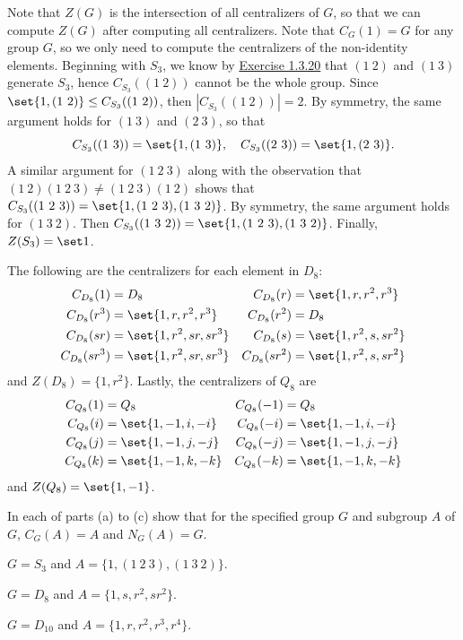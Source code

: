 \begin{sol}
    Note that $Z(G)$ is the intersection of all centralizers of $G$, so that we can compute $Z(G)$ after computing all centralizers. Note that $C_G(1) = G$ for any group $G$, so we only need to compute the centralizers of the non-identity elements. Beginning with $S_3$, we know by \hyperref[ex1.3.20]{Exercise 1.3.20} that $(1\ 2)$ and $(1\ 3)$ generate $S_3$, hence $C_{S_3}((1\ 2))$ cannot be the whole group. Since $\set{1, (1\ 2)} \leq C_{S_3}((1\ 2))$, then $|C_{S_3}((1\ 2))| = 2$. By symmetry, the same argument holds for $(1\ 3)$ and $(2\ 3)$, so that
    \[C_{S_3}((1\ 3)) = \set{1, (1\ 3)}, \quad C_{S_3}((2\ 3)) = \set{1, (2\ 3)}.\]
    A similar argument for $(1\ 2\ 3)$ along with the observation that $(1\ 2)(1\ 2\ 3) \neq (1\ 2\ 3)(1\ 2)$ shows that $C_{S_3}((1\ 2\ 3)) = \set{1, (1\ 2\ 3), (1\ 3\ 2)}$. By symmetry, the same argument holds for $(1\ 3\ 2)$. Then $C_{S_3}((1\ 3\ 2)) = \set{1, (1\ 2\ 3), (1\ 3\ 2)}$. Finally, $Z(S_3) = \set 1$.
    
    The following are the centralizers for each element in $D_8$:
    \begin{align*}
        C_{D_8}(1) & = D_8 & C_{D_8}(r) & = \set{1, r, r^2, r^3} \\
        C_{D_8}(r^3) & = \set{1, r, r^2, r^3} & C_{D_8}(r^2) & = D_8 \\
        C_{D_8}(sr) & = \set{1, r^2, sr, sr^3} & C_{D_8}(s) & = \set{1, r^2, s, sr^2} \\
        C_{D_8}(sr^3) & = \set{1, r^2, sr, sr^3} & C_{D_8}(sr^2) & = \set{1, r^2, s, sr^2}
    \end{align*}
    and $Z(D_8) = \{1, r^2\}$. Lastly, the centralizers of $Q_8$ are
    \begin{align*}
        C_{Q_8}(1) & = Q_8 & C_{Q_8}(-1) & = Q_8 \\
        C_{Q_8}(i) & = \set{1, -1, i, -i} & C_{Q_8}(-i) & = \set{1, -1, i, -i} \\
        C_{Q_8}(j) & = \set{1, -1, j, -j} & C_{Q_8}(-j) & = \set{1, -1, j, -j} \\
        C_{Q_8}(k) & = \set{1, -1, k, -k} & C_{Q_8}(-k) & = \set{1, -1, k, -k}
    \end{align*}
    and $Z(Q_8) = \set{1, -1}$.
\end{sol}

\begin{exercise} \label{ex2.2.5}
    In each of parts (a) to (c) show that for the specified group $G$ and subgroup $A$ of $G$, $C_G(A)=A$ and $N_G(A)=G.$
    \begin{subproblems}
        \item $G=S_3$ and $A=\{1,(1\ 2\ 3),(1\ 3\ 2)\}.$
        \item $G=D_8$ and $A=\{1, s, r^2, sr^2\}.$
        \item $G=D_{10}$ and $A=\{1,r,r^2,r^3,r^4\}.$
    \end{subproblems}
\end{exercise}

